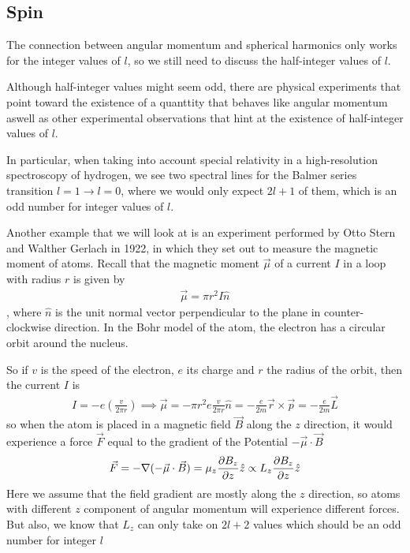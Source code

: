 \subsection{Spin}
The connection between angular momentum and spherical harmonics only works for the integer values of $l$, so we still need to discuss the half-integer values of $l$.

Although half-integer values might seem odd, there are physical experiments that point toward the existence of a quanttity that behaves like angular momentum aswell as other experimental observations that hint at the existence of half-integer values of $l$.

In particular, when taking into account special relativity in a high-resolution spectroscopy of hydrogen, we see two spectral lines for the Balmer series transition $l = 1 \to l = 0$, where we would only expect $2l + 1$ of them, which is an odd number for integer values of $l$.


Another example that we will look at is an experiment performed by Otto Stern and Walther Gerlach in 1922, in which they set out to measure the magnetic moment of atoms.
Recall that the magnetic moment $\vec{\mu}$ of a current $I$ in a loop with radius $r$ is given by
\begin{align*}
  \vec{\mu} = \pi r^{2} I \hat{n}
\end{align*}
, where $\hat{n}$ is the unit normal vector perpendicular to the plane in counter-clockwise direction. In the Bohr model of the atom, the electron has a circular orbit around the nucleus. 

So if $v$ is the speed of the electron, $e$ its charge and $r$ the radius of the orbit, then the current $I$ is
\begin{align*}
  I = -e \left(
    \frac{v}{2 \pi r}
  \right) \implies \vec{\mu} = - \pi r^{2} e \frac{v}{2 \pi r}\hat{n} = -\frac{e}{2m}\vec{r} \times \vec{p} = - \frac{e}{2m} \vec{L}
\end{align*}
so when the atom is placed in a magnetic field $\vec{B}$ along the $z$ direction, it would experience a force $\vec{F}$ equal to the gradient of the Potential $- \vec{\mu} \cdot \vec{B}$
\begin{align*}
  \vec{F} = - \nabla(-\vec{\mu} \cdot \vec{B}) = \mu_z \frac{\partial B_z}{\partial z}\hat{z} \propto L_z \frac{\partial B_z}{\partial z}\hat{z}
\end{align*}
Here we assume that the field gradient are mostly along the $z$ direction, so atoms with different $z$ component of angular momentum will experience different forces.
But also, we know that $L_z$ can only take on $2l+2$ values which should be an odd number for integer $l$

